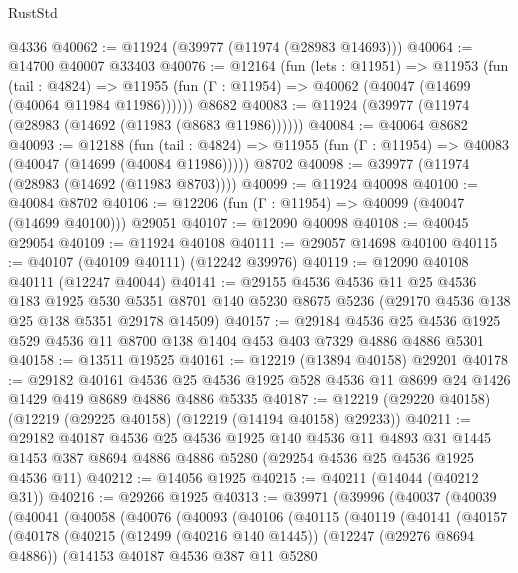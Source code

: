 \begin{lexlean}{RustStd}
\begin{coremodule}
{\begin{coremodule}
{{{{{{{{{{{{{{{{{{{{{{{{{{{{{{{{{{{{{{{{{{{{{{{{{{{{{{{{{{{{{{{{{{{{{{{{{{{{{{{{    @4336
@40062 := @11924 (@39977 (@11974 (@28983 @14693)))
@40064 := @14700 @40007 @33403
@40076 := @12164
    (fun (lets : @11951) =>
    @11953
      (fun (tail : @4824) =>
      @11955 (fun (Γ : @11954) => @40062 (@40047 (@14699 (@40064 @11984 @11986))))))
    @8682
@40083 := @11924 (@39977 (@11974 (@28983 (@14692 (@11983 (@8683 @11986))))))
@40084 := @40064 @8682
@40093 := @12188
    (fun (tail : @4824) => @11955 (fun (Γ : @11954) => @40083 (@40047 (@14699 (@40084 @11986)))))
    @8702
@40098 := @39977 (@11974 (@28983 (@14692 (@11983 @8703))))
@40099 := @11924 @40098
@40100 := @40084 @8702
@40106 := @12206 (fun (Γ : @11954) => @40099 (@40047 (@14699 @40100))) @29051
@40107 := @12090 @40098
@40108 := @40045 @29054
@40109 := @11924 @40108
@40111 := @29057 @14698 @40100
@40115 := @40107 (@40109 @40111) (@12242 @39976)
@40119 := @12090 @40108 @40111 (@12247 @40044)
@40141 := @29155
    @4536
    @4536
    @11
    @25
    @4536
    @183
    @1925
    @530
    @5351
    @8701
    @140
    @5230
    @8675
    @5236
    (@29170 @4536 @138 @25 @138 @5351 @29178 @14509)
@40157 := @29184
    @4536
    @25
    @4536
    @1925
    @529
    @4536
    @11
    @8700
    @138
    @1404
    @453
    @403
    @7329
    @4886
    @4886
    @5301
@40158 := @13511 @19525
@40161 := @12219 (@13894 @40158) @29201
@40178 := @29182
    @40161
    @4536
    @25
    @4536
    @1925
    @528
    @4536
    @11
    @8699
    @24
    @1426
    @1429
    @419
    @8689
    @4886
    @4886
    @5335
@40187 := @12219 (@29220 @40158) (@12219 (@29225 @40158) (@12219 (@14194 @40158) @29233))
@40211 := @29182
    @40187
    @4536
    @25
    @4536
    @1925
    @140
    @4536
    @11
    @4893
    @31
    @1445
    @1453
    @387
    @8694
    @4886
    @4886
    @5280
    (@29254 @4536 @25 @4536 @1925 @4536 @11)
@40212 := @14056 @1925
@40215 := @40211 (@14044 (@40212 @31))
@40216 := @29266 @1925
@40313 := @39971
    (@39996
      (@40037
        (@40039
          (@40041
            (@40058
              (@40076
                (@40093
                  (@40106
                    (@40115
                      (@40119
                        (@40141
                          (@40157
                            (@40178
                              (@40215
                                (@12499 (@40216 @140 @1445))
                                (@12247 (@29276 @8694 @4886))
                                (@14153
                                  @40187
                                  @4536
                                  @387
                                  @11
                                  @5280
}}}}}}}}}}}}}}}}}}}}}}}}}}}}}}}}}}}}}}}}}}}}}}}}}}}}}}}}}}}}}}}}}}}}}}}}}}}}}}}}
\end{coremodule}}
\end{coremodule}
\end{lexlean}

